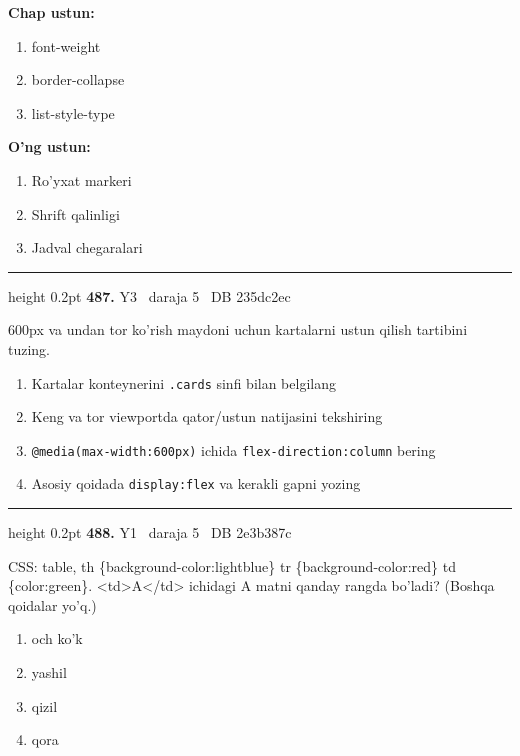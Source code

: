 \documentclass[10pt,a4paper,oneside]{article}
\begin{document}
\textbf{\footnotesize Chap ustun:}
\begin{enumerate}[label=\arabic*),leftmargin=9mm]
\item font-weight
\item border-collapse
\item list-style-type
\end{enumerate}
\textbf{\footnotesize O'ng ustun:}
\begin{enumerate}[label=\Alph*),leftmargin=9mm]
\item Ro'yxat markeri
\item Shrift qalinligi
\item Jadval chegaralari
\end{enumerate}
\vspace{2mm}\hrule height 0.2pt \vspace{4mm}
\hypertarget{q487}{\textbf{\color{ink}487.}}  {\color{muted}\scriptsize Y3 \textbullet\ daraja 5 \textbullet\ DB 235dc2ec}
\par
600px va undan tor ko'rish maydoni uchun kartalarni ustun qilish tartibini tuzing.
\begin{enumerate}[label=\Alph*),leftmargin=9mm]
\item Kartalar konteynerini \texttt{.cards} sinfi bilan belgilang
\item Keng va tor viewportda qator/ustun natijasini tekshiring
\item \texttt{@media(max-width:600px)} ichida \texttt{flex-direction:column} bering
\item Asosiy qoidada \texttt{display:flex} va kerakli gapni yozing
\end{enumerate}
\vspace{2mm}\hrule height 0.2pt \vspace{4mm}
\hypertarget{q488}{\textbf{\color{ink}488.}}  {\color{muted}\scriptsize Y1 \textbullet\ daraja 5 \textbullet\ DB 2e3b387c}
\par
CSS: table, th \{background-color:lightblue\} tr \{background-color:red\} td \{color:green\}. \textless{}td\textgreater{}A\textless{}/td\textgreater{} ichidagi A matni qanday rangda bo'ladi? (Boshqa qoidalar yo'q.)
\begin{enumerate}[label=\Alph*),leftmargin=9mm]
\item och ko'k
\item yashil
\item qizil
\item qora
\end{enumerate}
\end{document}
